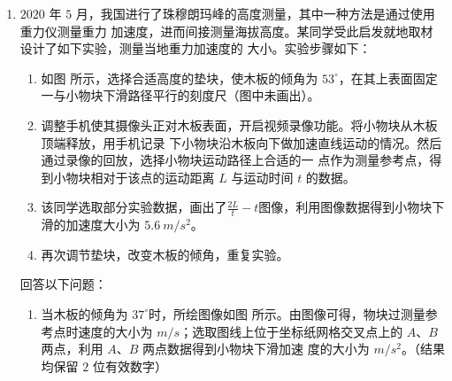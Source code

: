 \begin{enumerate}
\pfourchoices
{}
{}
{}
{}









\gaokaosy

\item
$ 2020 $ 年 $ 5 $ 月，我国进行了珠穆朗玛峰的高度测量，其中一种方法是通过使用重力仪测量重力
加速度，进而间接测量海拔高度。某同学受此启发就地取材设计了如下实验，测量当地重力加速度的
大小。实验步骤如下：
\begin{figure}[h!]
\centering
\begin{subfigure}{0.4\linewidth}
\centering
 
\caption{}\label{2020:山东:13a}
\end{subfigure}
\begin{subfigure}{0.8\linewidth}
\centering
 
\caption{}\label{2020:山东:13b}
\end{subfigure}
\end{figure}

\begin{enumerate}
\renewcommand{\labelenumii}{\roman{enumii}.}
\item
如图  所示，选择合适高度的垫块，使木板的倾角为 $ 53 ^{ \circ } $，在其上表面固定一与小物块下滑路径平行的刻度尺（图中未画出）。
\item 
调整手机使其摄像头正对木板表面，开启视频录像功能。将小物块从木板顶端释放，用手机记录
下小物块沿木板向下做加速直线运动的情况。然后通过录像的回放，选择小物块运动路径上合适的一
点作为测量参考点，得到小物块相对于该点的运动距离 $ L $ 与运动时间 $ t $ 的数据。
\item 
该同学选取部分实验数据，画出了$\frac{2 L}{t}-t$图像，利用图像数据得到小物块下滑的加速度大小为 $ 5.6 \ m/s^{2} $。
\item 
再次调节垫块，改变木板的倾角，重复实验。

\end{enumerate}


回答以下问题：
\begin{enumerate}
\item
当木板的倾角为 $ 37 ^{ \circ } $时，所绘图像如图  所示。由图像可得，物块过测量参考点时速度的大小为 \underlinegap 
$ m/s $；选取图线上位于坐标纸网格交叉点上的 $ A $、$ B $ 两点，利用 $ A $、$ B $ 两点数据得到小物块下滑加速
度的大小为 \underlinegap $ m/s^{2} $。（结果均保留 $ 2 $ 位有效数字）



\end{enumerate}
\end{enumerate}
